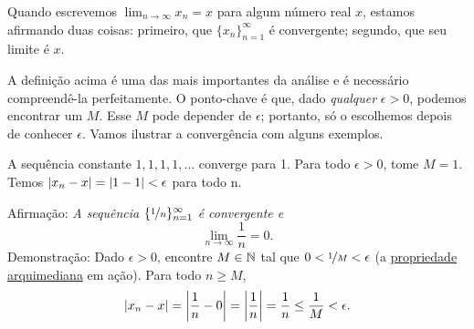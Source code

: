 \begin{myfigureht}
\caption{Ilustração da convergência.
Acima, mostramos os dez primeiros termos da sequência como um gráfico, com
$M$ e o intervalo em torno do limite $x$ assinalados.
Abaixo, os termos da mesma sequência estão marcados na reta real.
\label{figsequenceconvergence}}
\end{myfigureht}

Quando escrevemos $\lim_{n\to\infty} x_n = x$ para algum número real $x$,
estamos afirmando duas coisas: primeiro, que $\{ x_n \}_{n=1}^\infty$ é
convergente; segundo, que seu limite é $x$.

A definição acima é uma das mais importantes da análise e é necessário
compreendê-la perfeitamente. O ponto-chave é que, dado \emph{qualquer}
$\epsilon > 0$, podemos encontrar um $M$. Esse $M$ pode depender de
$\epsilon$; portanto, só o escolhemos depois de conhecer $\epsilon$.
Vamos ilustrar a convergência com alguns exemplos.

\begin{example}
A sequência constante $1,1,1,1,\ldots$ converge para 1. Para todo
$\epsilon > 0$, tome $M = 1$. Temos
$\lvert {x_n-x} \rvert = \lvert {1-1} \rvert < \epsilon$ para todo n.
\end{example}

\begin{example}
Afirmação: \emph{A sequência $\{ \nicefrac{1}{n} \}_{n=1}^\infty$ é convergente e}
\begin{equation*}
\lim_{n\to \infty} \frac{1}{n} = 0 .
\end{equation*}
Demonstração: Dado $\epsilon > 0$, encontre $M \in {\mathbb{N}}$ tal que
$0 < \nicefrac{1}{M} < \epsilon$
(a \hyperref[thm:arch:i]{propriedade arquimediana} em ação).
Para todo $n \geq M$,
\begin{equation*}
\lvert {x_n - x} \rvert
=
\left\lvert {\frac{1}{n} - 0} \right\rvert = \left\lvert {\frac{1}{n}} \right\rvert = \frac{1}{n} \leq \frac{1}{M} < \epsilon .
\end{equation*}
\end{example}

